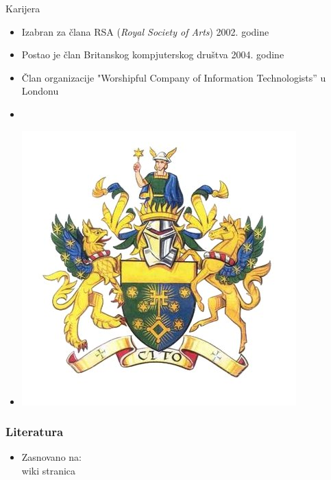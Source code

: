 \documentclass{beamer}
\begin{document}
\begin{frame}{Karijera}

    \begin{itemize}
    
    		\item Izabran za člana RSA (\textit{Royal Society of Arts}) 2002. godine
    
    		\item Postao je član Britanskog kompjuterskog društva 2004. godine
    
    		\item Član organizacije "Worshipful Company of Information Technologists” u Londonu
    
    		\item[]
    
    		\item[] \begin{center} \includegraphics[scale=0.25]{7Nb1Hw2A_400x400.jpg} \end{center}
    \end{itemize}

\end{frame}

\begin{frame}[fragile]\frametitle{Literatura}

	\begin{itemize}

		\item Zasnovano na:\\

		wiki stranica

	\end{itemize}

\end{frame}
\end{document}
